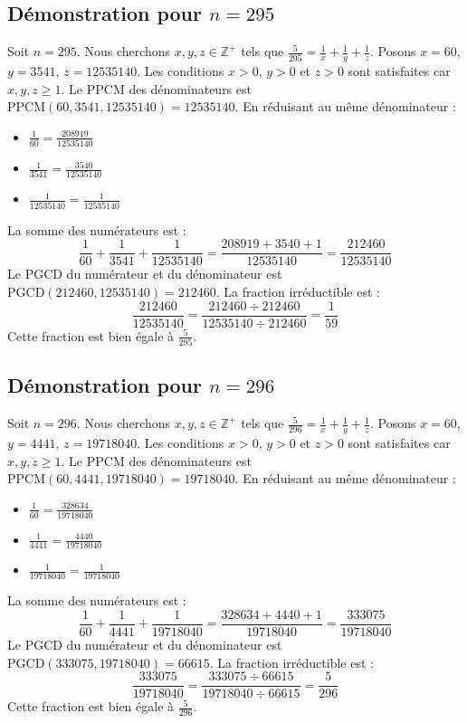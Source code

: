 \documentclass[11pt,a4paper]{article}
\begin{document}
\subsection{Démonstration pour $n = 295$}
Soit $n = 295$. Nous cherchons $x, y, z \in \mathbb{Z}^{+}$ tels que $\frac{5}{295} = \frac{1}{x} + \frac{1}{y} + \frac{1}{z}$.
Posons $x = 60$, $y = 3541$, $z = 12535140$.
Les conditions $x > 0$, $y > 0$ et $z > 0$ sont satisfaites car $x, y, z \geq 1$.
Le PPCM des dénominateurs est $\text{PPCM}(60, 3541, 12535140) = 12535140$.
En réduisant au même dénominateur :
\begin{itemize}
    \item $\frac{1}{60} = \frac{208919}{12535140}$
    \item $\frac{1}{3541} = \frac{3540}{12535140}$
    \item $\frac{1}{12535140} = \frac{1}{12535140}$
\end{itemize}
La somme des numérateurs est :
$$ \frac{1}{60} + \frac{1}{3541} + \frac{1}{12535140} = \frac{208919 + 3540 + 1}{12535140} = \frac{212460}{12535140} $$
Le PGCD du numérateur et du dénominateur est $\text{PGCD}(212460, 12535140) = 212460$.
La fraction irréductible est :
$$ \frac{212460}{12535140} = \frac{212460 \div 212460}{12535140 \div 212460} = \frac{1}{59} $$
Cette fraction est bien égale à $\frac{5}{295}$.

\subsection{Démonstration pour $n = 296$}
Soit $n = 296$. Nous cherchons $x, y, z \in \mathbb{Z}^{+}$ tels que $\frac{5}{296} = \frac{1}{x} + \frac{1}{y} + \frac{1}{z}$.
Posons $x = 60$, $y = 4441$, $z = 19718040$.
Les conditions $x > 0$, $y > 0$ et $z > 0$ sont satisfaites car $x, y, z \geq 1$.
Le PPCM des dénominateurs est $\text{PPCM}(60, 4441, 19718040) = 19718040$.
En réduisant au même dénominateur :
\begin{itemize}
    \item $\frac{1}{60} = \frac{328634}{19718040}$
    \item $\frac{1}{4441} = \frac{4440}{19718040}$
    \item $\frac{1}{19718040} = \frac{1}{19718040}$
\end{itemize}
La somme des numérateurs est :
$$ \frac{1}{60} + \frac{1}{4441} + \frac{1}{19718040} = \frac{328634 + 4440 + 1}{19718040} = \frac{333075}{19718040} $$
Le PGCD du numérateur et du dénominateur est $\text{PGCD}(333075, 19718040) = 66615$.
La fraction irréductible est :
$$ \frac{333075}{19718040} = \frac{333075 \div 66615}{19718040 \div 66615} = \frac{5}{296} $$
Cette fraction est bien égale à $\frac{5}{296}$.
\end{document}
